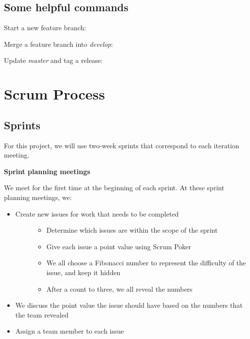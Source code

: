 \documentclass[letterpaper,10pt,oneside]{sphinxmanual}
\begin{document}
\subsection{Some helpful commands}
\label{process:some-helpful-commands}
Start a new feature branch:


Merge a feature branch into \emph{develop}:


Update \emph{master} and tag a release:



\section{Scrum Process}
\label{process:scrum-process}

\subsection{Sprints}
\label{process:sprints}
For this project, we will use two-week sprints that correspond to each iteration meeting.

\textbf{Sprint planning meetings}

We meet for the first time at the beginning of each sprint. At these sprint planning meetings, we:
\begin{itemize}
\item {} \begin{description}
\item[{Create new issues for work that needs to be completed}] \leavevmode\begin{itemize}
\item {} 
Determine which issues are within the scope of the sprint

\item {} 
Give each issue a point value using Scrum {}Poker

\item {} 
We all choose a Fibonacci number to represent the difficulty of the issue, and keep it hidden

\item {} 
After a count to three, we all reveal the numbers

\end{itemize}

\end{description}

\item {} 
We discuss the point value the issue should have based on the numbers that the team revealed

\item {} 
Assign a team member to each issue

\end{itemize}
\end{document}
